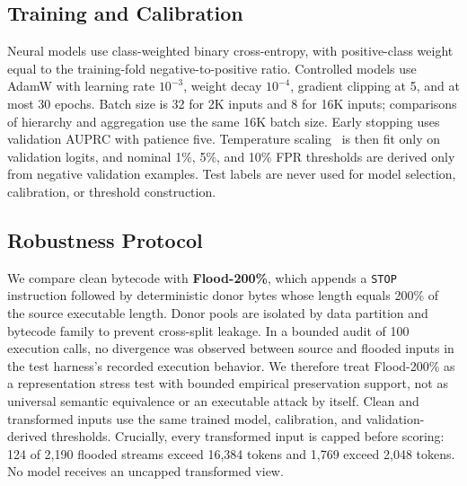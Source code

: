 \documentclass[conference]{IEEEtran}
\newcommand{\code}[1]{\texttt{#1}}
\begin{document}
\subsection{Training and Calibration}

Neural models use class-weighted binary cross-entropy, with positive-class weight equal to the training-fold negative-to-positive ratio. Controlled models use AdamW with learning rate $10^{-3}$, weight decay $10^{-4}$, gradient clipping at 5, and at most 30 epochs. Batch size is 32 for 2K inputs and 8 for 16K inputs; comparisons of hierarchy and aggregation use the same 16K batch size. Early stopping uses validation AUPRC with patience five. Temperature scaling~\cite{guo2017calibration} is then fit only on validation logits, and nominal 1\%, 5\%, and 10\% FPR thresholds are derived only from negative validation examples. Test labels are never used for model selection, calibration, or threshold construction.

\subsection{Robustness Protocol}

We compare clean bytecode with \textbf{Flood-200\%}, which appends a \code{STOP} instruction followed by deterministic donor bytes whose length equals 200\% of the source executable length. Donor pools are isolated by data partition and bytecode family to prevent cross-split leakage. In a bounded audit of 100 execution calls, no divergence was observed between source and flooded inputs in the test harness's recorded execution behavior. We therefore treat Flood-200\% as a representation stress test with bounded empirical preservation support, not as universal semantic equivalence or an executable attack by itself. Clean and transformed inputs use the same trained model, calibration, and validation-derived thresholds. Crucially, every transformed input is capped before scoring: 124 of 2,190 flooded streams exceed 16,384 tokens and 1,769 exceed 2,048 tokens. No model receives an uncapped transformed view.
\end{document}
